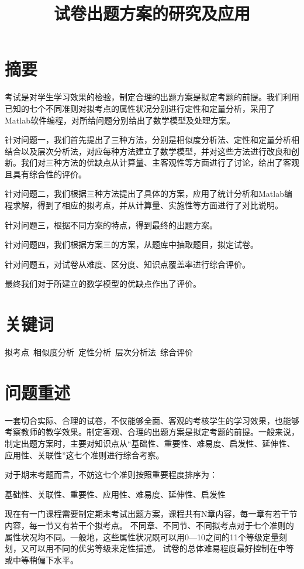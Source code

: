 \documentclass{ctexart}
\date{}
\title{试卷出题方案的研究及应用}
\begin{document}
\maketitle
\section*{摘要}
考试是对学生学习效果的检验，制定合理的出题方案是拟定考题的前提。我们利用已知的七个不同准则对拟考点的属性状况分别进行定性和定量分析，采用了Matlab软件编程，对所给问题分别给出了数学模型及处理方案。

针对问题一，我们首先提出了三种方法，分别是相似度分析法、定性和定量分析相结合以及层次分析法，对应每种方法建立了数学模型，并对这些方法进行改良和创新。我们对三种方法的优缺点从计算量、主客观性等方面进行了讨论，给出了客观且具有综合性的评价。


针对问题二，我们根据三种方法提出了具体的方案，应用了统计分析和Matlab编程求解，得到了相应的拟考点，并从计算量、实施性等方面进行了对比说明。



针对问题三，根据不同方案的特点，得到最终的出题方案。

针对问题四，我们根据方案三的方案，从题库中抽取题目，拟定试卷。

针对问题五，对试卷从难度、区分度、知识点覆盖率进行综合评价。

最终我们对于所建立的数学模型的优缺点作出了评价。
\section*{关键词}
拟考点\  相似度分析\ 定性分析\ 层次分析法\  综合评价

\section{问题重述}
一套切合实际、合理的试卷，不仅能够全面、客观的考核学生的学习效果，也能够考察教师的教学效果。制定客观、合理的出题方案是拟定考题的前提。一般来说，制定出题方案时，主要对知识点从“基础性、重要性、难易度、启发性、延伸性、应用性、关联性”这七个准则进行综合考察。

对于期末考题而言，不妨这七个准则按照重要程度排序为：

基础性、关联性、重要性、应用性、难易度、延伸性、启发性

现在有一门课程需要制定期末考试出题方案，课程共有N章内容，每一章有若干节内容，每一节又有若干个拟考点。
不同章、不同节、不同拟考点对于七个准则的属性状况均不同。一般地，这些属性状况既可以用0—10之间的11个等级定量刻划，又可以用不同的优劣等级来定性描述。
试卷的总体难易程度最好控制在中等或中等稍偏下水平。
\end{document}
